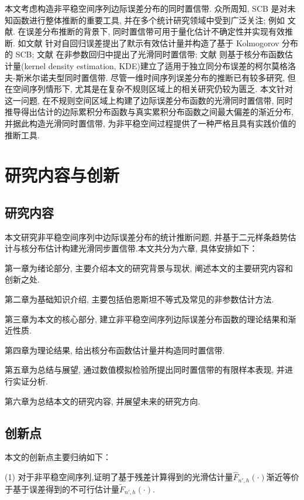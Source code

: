 \documentclass[a4paper,openay,14pt]{ctexbook}
\numberwithin{equation}{section}
\numberwithin{lem}{section}
\begin{document}
本文考虑构造非平稳空间序列边际误差分布的同时置信带. 众所周知, SCB 是对未知函数进行整体推断的重要工具, 并在多个统计研究领域中受到广泛关注; 例如
文献\cite{wang2013smooth, gu2014simultaneous, wang2014oracally, cao2016oracle, zhang2018smooth, wang2022oracle}.
在误差分布推断的背景下, 同时置信带可用于量化估计不确定性并实现有效推断. 如文献\cite{wang2014oracally} 针对自回归误差提出了默示有效估计量并构造了基于 Kolmogorov 分布的 SCB; 文献\cite{gu2021smooth} 在非参数回归中提出了光滑同时置信带; 文献\cite{wang2022oracle} 则基于核分布函数估计量(kernel density estimation, KDE)建立了适用于独立同分布误差的柯尔莫格洛夫-斯米尔诺夫型同时置信带. 尽管一维时间序列误差分布的推断已有较多研究, 但在空间序列情形下, 尤其是在复杂不规则区域上的相关研究仍较为匮乏. 本文针对这一问题, 在不规则空间区域上构建了边际误差分布函数的光滑同时置信带, 同时推导得出估计的边际累积分布函数与真实累积分布函数之间最大偏差的渐近分布, 并据此构造光滑同时置信带, 为非平稳空间过程提供了一种严格且具有实践价值的推断工具.


\section{研究内容与创新}
\subsection{研究内容}
本文研究非平稳空间序列中边际误差分布的统计推断问题,  并基于二元样条趋势估计与核分布估计构建光滑同步置信带.本文共分为六章, 具体安排如下：

第一章为绪论部分,  主要介绍本文的研究背景与现状,  阐述本文的主要研究内容和创新之处. 

第二章为基础知识介绍,  主要包括伯恩斯坦不等式及常见的非参数估计方法. 

第三章为本文的核心部分,   建立非平稳空间序列边际误差分布函数的理论结果和渐近性质.

第四章为理论结果, 给出核分布函数估计量并构造同时置信带. 

第五章为总结与展望, 通过数值模拟检验所提出同时置信带的有限样本表现, 并进行实证分析. 

第六章为总结本文的研究内容,  并展望未来的研究方向. 

\subsection{创新点}
本文的创新点主要归纳如下：

(1) 对于非平稳空间序列,证明了基于残差计算得到的光滑估计量$\hat{F}_{n',h}(\cdot)$渐近等价于基于误差得到的不可行估计量$\tilde{F}_{n',h}(\cdot)$.
\end{document}
